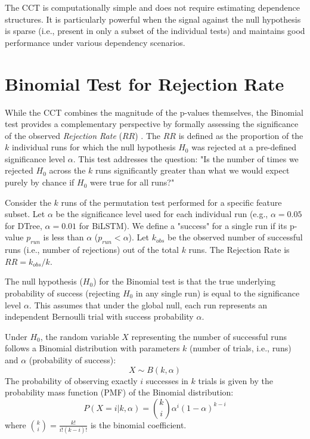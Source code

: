 \begin{appendices}
  The CCT is computationally simple and does not require estimating dependence structures. It is particularly powerful when the signal against the null hypothesis is sparse (i.e., present in only a subset of the individual tests) and maintains good performance under various dependency scenarios.

  \section{Binomial Test for Rejection Rate}
  \label{sec:binom_test_methodology}

  While the CCT combines the magnitude of the p-values themselves, the Binomial test provides a complementary perspective by formally assessing the significance of the observed \textit{Rejection Rate} ($RR$) \autocite{fahrmeir2016statistik}. The $RR$ is defined as the proportion of the $k$ individual runs for which the null hypothesis $H_0$ was rejected at a pre-defined significance level $\alpha$.
  This test addresses the question: "Is the number of times we rejected $H_0$ across the $k$ runs significantly greater than what we would expect purely by chance if $H_0$ were true for all runs?"

  Consider the $k$ runs of the permutation test performed for a specific feature subset. Let $\alpha$ be the significance level used for each individual run (e.g., $\alpha=0.05$ for DTree, $\alpha=0.01$ for BiLSTM). We define a "success" for a single run if its p-value $p_{run}$ is less than $\alpha$ ($p_{run} < \alpha$). Let $k_{obs}$ be the observed number of successful runs (i.e., number of rejections) out of the total $k$ runs. The Rejection Rate is $RR = k_{obs}/k$.

  The null hypothesis ($H_0$) for the Binomial test is that the true underlying probability of success (rejecting $H_0$ in any single run) is equal to the significance level $\alpha$. This assumes that under the global null, each run represents an independent Bernoulli trial with success probability $\alpha$.

  Under $H_0$, the random variable $X$ representing the number of successful runs follows a Binomial distribution with parameters $k$ (number of trials, i.e., runs) and $\alpha$ (probability of success):
  \begin{equation}
    X \sim B(k, \alpha)
  \end{equation}
  The probability of observing exactly $i$ successes in $k$ trials is given by the probability mass function (PMF) of the Binomial distribution:
  \begin{equation}
    P(X=i | k, \alpha) = \binom{k}{i} \alpha^i (1-\alpha)^{k-i}
    \label{eq:binom_pmf}
  \end{equation}
  where $\binom{k}{i} = \frac{k!}{i!(k-i)!}$ is the binomial coefficient.


\end{appendices}
